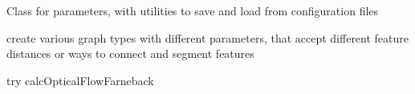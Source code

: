 
\begin{DoxyRefList}
\item[\label{todo__todo000003}%
\hypertarget{todo__todo000003}{}%
Namespace \hyperlink{namespaceboost}{boost} ]Class for parameters, with utilities to save and load from configuration files  
\item[\label{todo__todo000002}%
\hypertarget{todo__todo000002}{}%
Class \hyperlink{classFeatureGraph}{Feature\-Graph} ]create various graph types with different parameters, that accept different feature distances or ways to connect and segment features  
\item[\label{todo__todo000001}%
\hypertarget{todo__todo000001}{}%
Member \hyperlink{feature-based-tracking_8cpp_acaa5ac77506c5a9ca4454920c475cd1e}{track\-Features} (const \hyperlink{structKLTFeatureTrackingParameters}{K\-L\-T\-Feature\-Tracking\-Parameters} \&params)]try calc\-Optical\-Flow\-Farneback 
\end{DoxyRefList}